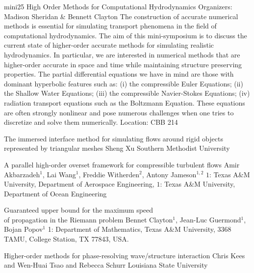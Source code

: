 \mini
{mini25}
{High Order Methods for Computational Hydrodynamics}
{Organizers: Madison Sheridan \& Bennett Clayton}
{The construction of accurate numerical methods is essential for simulating transport phenomena in the field of computational hydrodynamics. The aim of this mini-symposium is to discuss the current state of higher-order accurate methods for simulating realistic hydrodynamics. In particular, we are interested in numerical methods that are higher-order accurate in space and time while maintaining structure preserving properties. The partial differential equations we have in mind are those with dominant hyperbolic features such as: (i) the compressible Euler Equations; (ii) the Shallow Water Equations; (iii) the compressible Navier-Stokes Equations; (iv) radiation transport equations such as the Boltzmann Equation. These equations are often strongly nonlinear and pose numerous challenges when one tries to discretize and solve them numerically.}
{Location: CBB 214}

\begin{talks}
\item\talk
{The immersed interface method for simulating flows around rigid objects represented by triangular meshes}
{Sheng Xu}
{Southern Methodist University}
\item\talk
{A parallel high-order overset framework for compressible turbulent flows}
{Amir Akbarzadeh$^1$, Lai Wang$^1$, Freddie Witherden$^2$, Antony Jameson$^{1,2}$}
{$1$: Texas A\&M University, Department of Aerospace Engineering, $1$: Texas A\&M University, Department of Ocean Engineering}
\item\talk
{Guaranteed upper bound for the maximum speed\\ of propagation in the Riemann problem}
{Bennet Clayton$^1$, Jean-Luc Guermond$^1$, Bojan Popov$^1$}
{1: Department of Mathematics, Texas A\&M University, 3368 TAMU, College Station, TX 77843, USA.}
\item\talk
{Higher-order methods for phase-resolving wave/structure interaction}
{Chris Kees and Wen-Huai Tsao and Rebecca Schurr}
{Louisiana State University}
\end{talks}
\room
